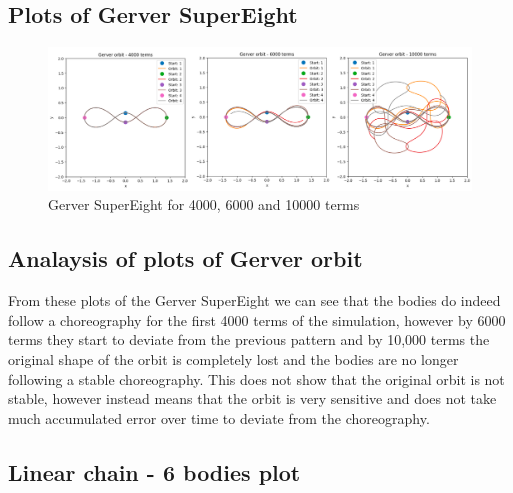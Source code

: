 \documentclass[11pt]{article}
\begin{document}
\newpage

\subsection{Plots of Gerver SuperEight}
\begin{figure}[!ht]
\centerline{\includegraphics[scale=0.35]{Pictures/Gerver_SuperEight.png}}
\caption{Gerver SuperEight for 4000, 6000 and 10000 terms}
\label{Gerver_SuperEight}
\end{figure}



\subsection{Analaysis of plots of Gerver orbit}

From these plots of the Gerver SuperEight we can see that the bodies do indeed follow a choreography for the first 4000 terms of the simulation, however by 6000 terms they start to deviate from the previous pattern and by 10,000 terms the original shape of the orbit is completely lost and the bodies are no longer following a stable choreography. This does not show that the original orbit is not stable, however instead means that the orbit is very sensitive and does not take much accumulated error over time to deviate from the choreography.


\subsection{Linear chain - 6 bodies plot}
\end{document}
